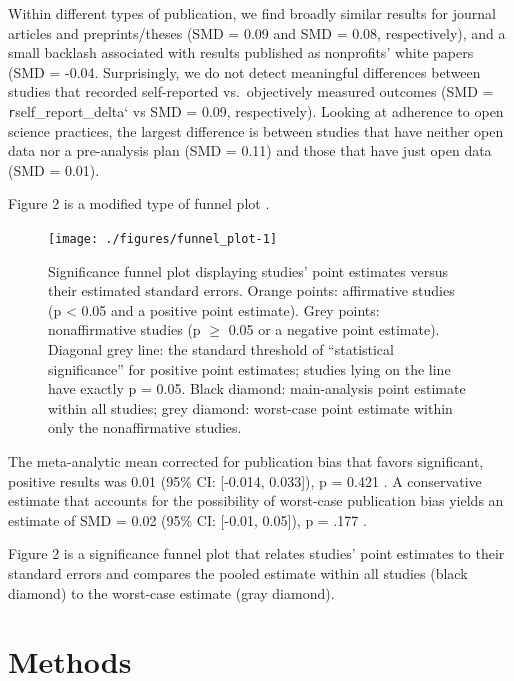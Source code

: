 \documentclass[sn-nature,referee,pdflatex]{sn-jnl}
\begin{document}
Within different types of publication, we find broadly similar results
for journal articles and preprints/theses (SMD = 0.09 and SMD = 0.08,
respectively), and a small backlash associated with results published as
nonprofits' white papers (SMD = -0.04. Surprisingly, we do not detect
meaningful differences between studies that recorded self-reported
vs.~objectively measured outcomes (SMD = \texttt{r}self\_report\_delta`
vs SMD = 0.09, respectively). Looking at adherence to open science
practices, the largest difference is between studies that have neither
open data nor a pre-analysis plan (SMD = 0.11) and those that have just
open data (SMD = 0.01).

Figure 2 is a modified type of funnel plot \citep{mathur2020}.

\begin{figure}[H]

{\centering \texttt{[image: ./figures/funnel\_plot-1]} 

}

\caption{Significance funnel plot displaying studies’ point estimates versus their estimated standard errors. Orange points: affirmative studies (p < 0.05 and a positive point estimate). Grey points: nonaffirmative studies (p $\geq$ 0.05 or a negative point estimate). Diagonal grey line: the standard threshold of “statistical significance” for positive point estimates; studies lying on the line have exactly p = 0.05. Black diamond: main-analysis point estimate within all studies; grey diamond: worst-case point estimate within only the nonaffirmative studies.}\label{fig:funnel_plot}
\end{figure}

The meta-analytic mean corrected for publication bias that favors
significant, positive results was 0.01 (95\% CI: {[}-0.014, 0.033{]}), p
= 0.421 \citep{hedges1992}. A conservative estimate that accounts for
the possibility of worst-case publication bias yields an estimate of SMD
= 0.02 (95\% CI: {[}-0.01, 0.05{]}), p = .177
\citep{mathur2020, mathur2024}.

Figure 2 is a significance funnel plot \citep{mathur2020} that relates
studies' point estimates to their standard errors and compares the
pooled estimate within all studies (black diamond) to the worst-case
estimate (gray diamond).

\section{Methods}\label{sec3}
\end{document}
